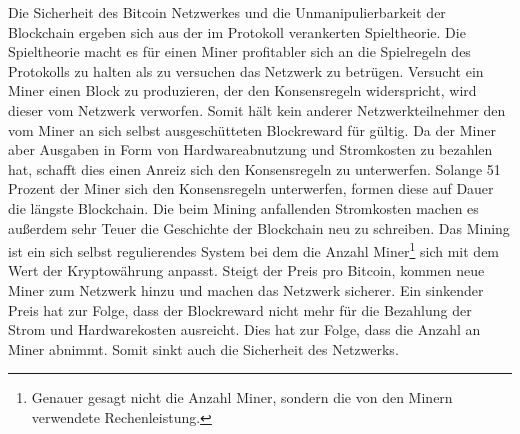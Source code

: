 Die Sicherheit des Bitcoin Netzwerkes und die Unmanipulierbarkeit der Blockchain ergeben sich aus der im Protokoll verankerten Spieltheorie. Die Spieltheorie macht es für einen Miner profitabler sich an die Spielregeln des Protokolls zu halten als zu versuchen das Netzwerk zu betrügen. Versucht ein Miner einen Block zu produzieren, der den Konsensregeln widerspricht, wird dieser vom Netzwerk verworfen. Somit hält kein anderer Netzwerkteilnehmer den vom Miner an sich selbst ausgeschütteten Blockreward für gültig. Da der Miner aber Ausgaben in Form von Hardwareabnutzung und Stromkosten zu bezahlen hat, schafft dies einen Anreiz sich den Konsensregeln zu unterwerfen. Solange 51 Prozent der Miner sich den Konsensregeln unterwerfen, formen diese auf Dauer die längste Blockchain. Die beim Mining anfallenden Stromkosten machen es außerdem sehr Teuer die Geschichte der Blockchain neu zu schreiben.
Das Mining ist ein sich selbst regulierendes System bei dem die Anzahl Miner\footnote{Genauer gesagt nicht die Anzahl Miner, sondern die von den Minern verwendete Rechenleistung.} sich mit dem Wert der Kryptowährung anpasst. Steigt der Preis pro Bitcoin, kommen neue Miner zum Netzwerk hinzu und machen das Netzwerk sicherer. Ein sinkender Preis hat zur Folge, dass der Blockreward nicht mehr für die Bezahlung der Strom und Hardwarekosten ausreicht. Dies hat zur Folge, dass die Anzahl an Miner abnimmt. Somit sinkt auch die Sicherheit des Netzwerks.